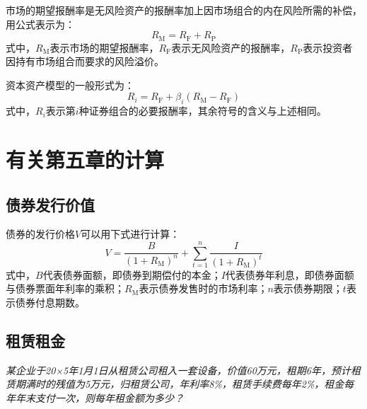 \documentclass[
  10pt,
  twoside,
  openany,
  b5paper, %
  colorscheme = black, %
  xits = false,
]{qyxf-book}
\begin{document}
市场的期望报酬率是无风险资产的报酬率加上因市场组合的内在风险所需的补偿，用公式表示为：
\begin{equation*}
	R_\mathrm{M} = R_\mathrm{F} + R_\mathrm{P}
\end{equation*}
式中，$R_\mathrm{M}$表示市场的期望报酬率，$R_\mathrm{F}$表示无风险资产的报酬率，$R_\mathrm{P}$表示投资者因持有市场组合而要求的风险溢价。

资本资产模型的一般形式为：
\begin{equation*}
	R_i = R_\mathrm{F} + \beta_i (R_\mathrm{M} - R_\mathrm{F})
\end{equation*}
式中，$R_i$表示第$i$种证券组合的必要报酬率，其余符号的含义与上述相同。

\newpage

\section{有关第五章的计算}
\subsection{债券发行价值}


债券的发行价格$V$可以用下式进行计算：
\begin{equation*}
	V = \frac{B}{(1+R_\mathrm{M})^n}+\sum_{t=1}^{n}\frac{I}{(1+R_\mathrm{M})^t}
\end{equation*}
式中，$B$代表债券面额，即债券到期偿付的本金；$I$代表债券年利息，即债券面额与债券票面年利率的乘积；$R_\mathrm{M}$表示债券发售时的市场利率；$n$表示债券期限；$t$表示债券付息期数。

\subsection{租赁租金}

\emph{某企业于20×5年1月1日从租赁公司租入一套设备，价值60万元，租期6年，预计租赁期满时的残值为5万元，归租赁公司，年利率8\%，租赁手续费每年2\%，租金每年年末支付一次，则每年租金额为多少？}
\end{document}
